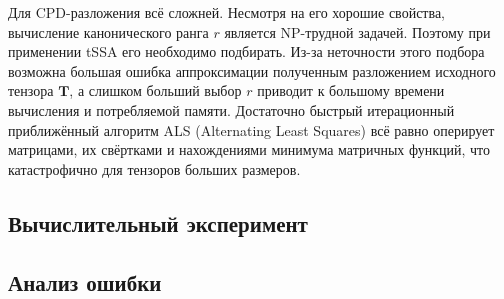 			 		Для CPD-разложения всё сложней. Несмотря на его хорошие свойства, вычисление канонического ранга $ r $ является NP-трудной задачей. Поэтому при  применении tSSA его необходимо подбирать. Из-за неточности этого подбора возможна большая ошибка аппроксимации полученным разложением исходного тензора $ \mathbf{T} $, а слишком больший выбор $ r $ приводит к большому времени вычисления и потребляемой памяти. Достаточно быстрый итерационный приближённый алгоритм ALS (Alternating Least Squares) всё равно оперирует матрицами, их свёртками и нахождениями минимума матричных функций, что катастрофично для тензоров больших размеров.
			 
			 \subsection*{Вычислительный эксперимент}
			 
			 
			 \subsection*{Анализ ошибки}
			
			
		
		\newpage
		\printbibliography
	
